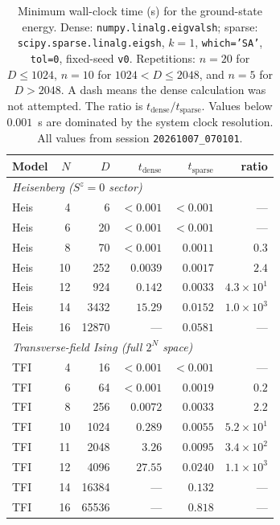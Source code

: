 \documentclass[pdflatex,sn-mathphys-num]{sn-jnl}
\begin{document}
\begin{table}[t]
\centering
\small
\caption{Minimum wall-clock time (s) for the ground-state energy.
Dense: \texttt{numpy.linalg.eigvalsh}; sparse:
\texttt{scipy.sparse.linalg.eigsh}, $k=1$, \texttt{which='SA'},
\texttt{tol=0}, fixed-seed \texttt{v0}. Repetitions: $n=20$ for
$D \le 1024$, $n=10$ for $1024 < D \le 2048$, and $n=5$ for
$D > 2048$. A dash means the dense calculation was not attempted.
The ratio is $t_{\mathrm{dense}}/t_{\mathrm{sparse}}$. Values below
$0.001$~s are dominated by the system clock resolution. All values
from session \texttt{20261007\_070101}.}
\label{tab:timing}
\begin{tabular}{lrrrrr}
\toprule
Model & $N$ & $D$ & $t_{\text{dense}}$ & $t_{\text{sparse}}$ & ratio \\
\midrule
\multicolumn{6}{l}{\textit{Heisenberg ($S^z = 0$ sector)}} \\
Heis & 4  & 6     & $<0.001$ & $<0.001$ & --- \\
Heis & 6  & 20    & $<0.001$ & $<0.001$ & --- \\
Heis & 8  & 70    & $<0.001$ & $0.0011$ & $0.3$ \\
Heis & 10 & 252   & $0.0039$ & $0.0017$ & $2.4$ \\
Heis & 12 & 924   & $0.142$  & $0.0033$ & $4.3\times10^{1}$ \\
Heis & 14 & 3432  & $15.29$  & $0.0152$ & $1.0\times10^{3}$ \\
Heis & 16 & 12870 & ---      & $0.0581$ & --- \\
\multicolumn{6}{l}{\textit{Transverse-field Ising (full $2^N$ space)}} \\
TFI  & 4  & 16    & $<0.001$ & $<0.001$ & --- \\
TFI  & 6  & 64    & $<0.001$ & $0.0019$ & $0.2$ \\
TFI  & 8  & 256   & $0.0072$ & $0.0033$ & $2.2$ \\
TFI  & 10 & 1024  & $0.289$  & $0.0055$ & $5.2\times10^{1}$ \\
TFI  & 11 & 2048  & $3.26$   & $0.0095$ & $3.4\times10^{2}$ \\
TFI  & 12 & 4096  & $27.55$  & $0.0240$ & $1.1\times10^{3}$ \\
TFI  & 14 & 16384 & ---      & $0.132$  & --- \\
TFI  & 16 & 65536 & ---      & $0.818$  & --- \\
\bottomrule
\end{tabular}
\end{table}
\end{document}
